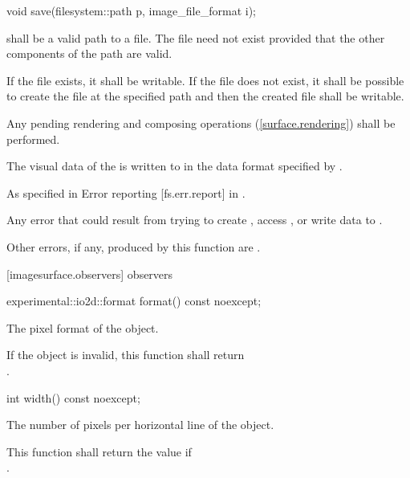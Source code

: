 \begin{itemdecl}
void save(filesystem::path p, image_file_format i);
\end{itemdecl}
\begin{itemdescr}
\pnum
\requires
{} shall be a valid path to a file. The file need not exist provided that the other components of the path are valid.

\pnum
If the file exists, it shall be writable. If the file does not exist, it shall be possible to create the file at the specified path and then the created file shall be writable.

\pnum
\effects
Any pending rendering and composing operations (\ref{surface.rendering}) shall be performed.

\pnum
The visual data of the \underlyingimagesurface is written to  in the data format specified by .

\pnum
\throws
As specified in Error reporting [fs.err.report] in \cppseventeen.

\pnum
\errors
Any error that could result from trying to create , access , or write data to .

\pnum
Other errors, if any, produced by this function are .
\end{itemdescr}

 [imagesurface.observers] { observers}

\begin{itemdecl}
experimental::io2d::format format() const noexcept;
\end{itemdecl}
\begin{itemdescr}
\pnum
\returns
The pixel format of the  object.

\pnum
\remarks
If the  object is invalid, this function shall return \\ .
\end{itemdescr}

\begin{itemdecl}
int width() const noexcept;
\end{itemdecl}
\begin{itemdescr}
\pnum
\returns
The number of pixels per horizontal line of the  object.

\pnum
\remarks
This function shall return the value  if \\
.
\end{itemdescr}

